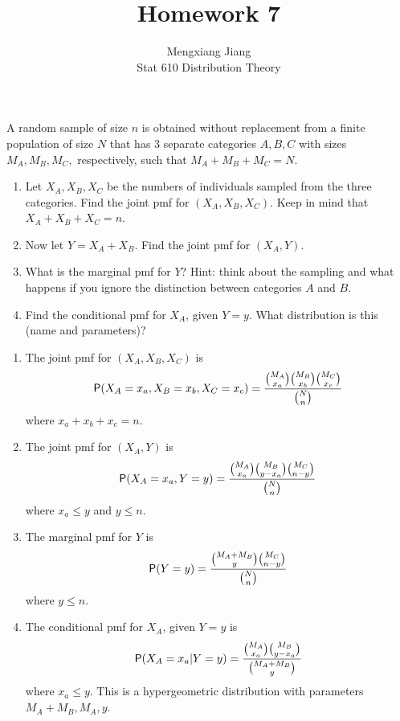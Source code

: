 \documentclass[12pt]{article}
\newcommand{\Prob}{{\sf P}}
\newenvironment{problem}[2][Problem]{\begin{trivlist}
\item[\hskip \labelsep {\bfseries #1}\hskip \labelsep {\bfseries #2.}]}
{\end{trivlist}}
\begin{document}
 
 
\title{Homework 7}%
\author{Mengxiang Jiang\\ %
Stat 610 Distribution Theory} %
 
\maketitle

\begin{problem}{1}
  A random sample of size $n$ is obtained without replacement from 
  a finite population of size $N$ that has 3 separate categories $A,B,C$ 
  with sizes $M_A, M_B , M_C ,$ respectively, such that
  $M_A + M_B + M_C = N$.
  \begin{enumerate}
    \item Let $X_A, X_B , X_C$ be the numbers of individuals sampled 
    from the three categories. Find the joint pmf for $(X_A, X_B , X_C)$. 
    Keep in mind that $X_A + X_B + X_C = n$.
    \item Now let $Y = X_A + X_B$. Find the joint pmf for $(X_A, Y)$.
    \item What is the marginal pmf for $Y$? Hint: think about the 
    sampling and what happens if you ignore the distinction between 
    categories $A$ and $B$.
    \item Find the conditional pmf for $X_A$, given $Y = y$. 
    What distribution is this (name and parameters)?
  \end{enumerate}

  \begin{enumerate}
    \item The joint pmf for $(X_A, X_B , X_C)$ is
    \[
      \Prob(X_A = x_a, X_B = x_b, X_C = x_c) = 
      \frac{\binom{M_A}{x_a} \binom{M_B}{x_b} \binom{M_C}{x_c}}
      {\binom{N}{n}}
    \]
    where $x_a + x_b + x_c = n$.
    \item The joint pmf for $(X_A, Y)$ is
    \[
      \Prob(X_A = x_a, Y = y) =
      \frac{\binom{M_A}{x_a} \binom{M_B}{y - x_a} \binom{M_C}{n - y}}
      {\binom{N}{n}}
    \]
    where $x_a \leq y$ and $y \leq n$.
    \item The marginal pmf for $Y$ is
    \[
      \Prob(Y = y) = 
      \frac{\binom{M_A + M_B}{y} \binom{M_C}{n - y}}{\binom{N}{n}}
    \]
    where $y \leq n$.
    \item The conditional pmf for $X_A$, given $Y = y$ is
    \[
      \Prob(X_A = x_a | Y = y) = 
      \frac{\binom{M_A}{x_a} \binom{M_B}{y - x_a}}{\binom{M_A + M_B}{y}}
    \]
    where $x_a \leq y$. This is a hypergeometric distribution with
    parameters $M_A + M_B, M_A, y$.
  \end{enumerate}
\end{problem}
\end{document}
